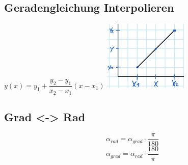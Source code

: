 %


\begin{minipage}{13cm}
	
	
\end{minipage}
\begin{minipage}{5cm}
	
\end{minipage}
\begin{multicols}{2}
	
	\columnbreak
	
	
\end{multicols}
\begin{multicols}{2}
	
	
	\columnbreak
	
	
\end{multicols}

\begin{minipage}{0.5\linewidth}
    \subsection{Geradengleichung Interpolieren}
    $ y(x)=y_1 + \dfrac{y_2 - y_1}{x_2 - x_1}(x-x_1) $\newline   
    \includegraphics[width=4cm]{idiotenseite/images/interpolieren}
\end{minipage}
\begin{minipage}{0.4\linewidth}
    \subsection{Grad <-> Rad}
    \[ \alpha_{rad}=\alpha_{grad}\cdot\dfrac{\pi}{180} \]
    \[ \alpha_{grad}=\alpha_{rad}\cdot\dfrac{180}{\pi} \]
\end{minipage}